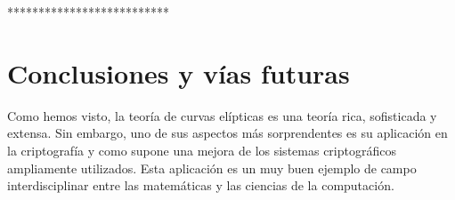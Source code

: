 **************************
\chapter{Conclusiones y vías futuras}
\label{ch:Conclusiones y vías futuras}

%
%

Como hemos visto, la teoría de curvas elípticas es una teoría rica, sofisticada y extensa. Sin embargo, uno de sus aspectos más sorprendentes es su aplicación en la criptografía y como supone una mejora de los sistemas criptográficos ampliamente utilizados. Esta aplicación es un muy buen ejemplo de campo interdisciplinar entre las matemáticas y las ciencias de la computación.

